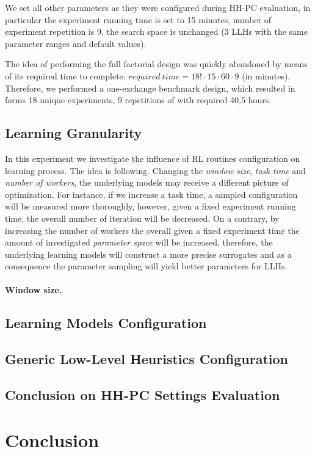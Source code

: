 We set all other parameters as they were configured during HH-PC evaluation, in particular the experiment running time is set to 15 minutes, number of experiment repetition is 9, the search space is unchanged (3 LLHs with the same parameter ranges and default values).

The idea of performing the full factorial design was quickly abandoned by means of its required time to complete: $required\ time = 18! \cdot 15 \cdot 60 \cdot 9$ (in minutes).
Therefore, we performed a one-exchange benchmark design, which resulted in forms 18 unique experiments, 9 repetitions of with required 40,5 hours.

\subsection{Learning Granularity}\label{eval:2:learning granularity}
In this experiment we investigate the influence of RL routines configuration on learning process. The idea is following. Changing the \emph{window size}, \emph{task time} and \emph{number of workers}, the underlying models may receive a different picture of optimization. For instance, if we increase a task time, a sampled configuration will be measured more thoroughly, however, given a fixed experiment running time, the overall number of iteration will be decreased. On a contrary, by increasing the number of workers the overall given a fixed experiment time the amount of investigated \emph{parameter space} will be increased, therefore, the underlying learning models will construct a more precise surrogates and as a consequence the parameter sampling will yield better parameters for LLHs.

\paragraph{Window size.}

\subsection{Learning Models Configuration}\label{eval:2:learning models}
\subsection{Generic Low-Level Heuristics Configuration}\label{eval:2:llh changes}
\subsection{Conclusion on HH-PC Settings Evaluation}\label{eval:2:conclusion}

\section{Conclusion}\label{eval: conclution}
